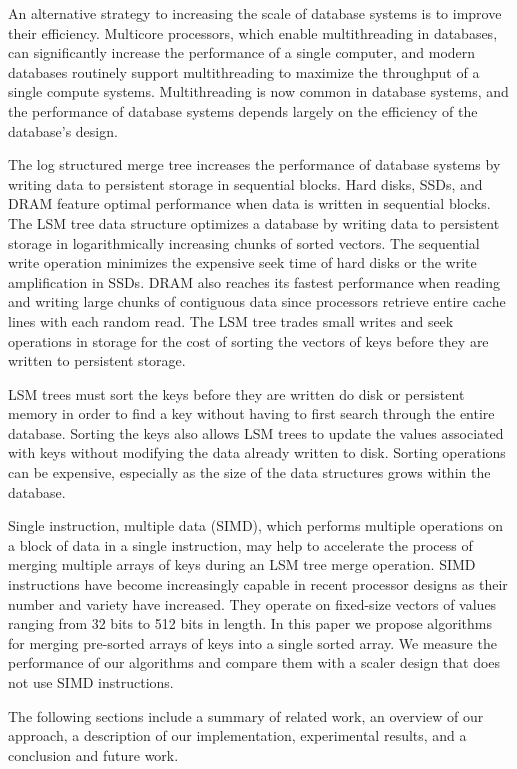 \documentclass[10pt,twocolumn]{article}
\begin{document}
An alternative strategy to increasing the scale of database systems is to improve their efficiency.  Multicore processors, which enable multithreading in databases, can significantly increase the performance of a single computer, and modern databases routinely support multithreading to maximize the throughput of a single compute systems.  Multithreading is now common in database systems, and the performance of database systems depends largely on the efficiency of the database's design.

The log structured merge tree increases the performance of database systems by writing data to persistent storage in sequential blocks.  Hard disks, SSDs, and DRAM feature optimal performance when data is written in sequential blocks.  The LSM tree data structure optimizes a database by writing data to persistent storage in logarithmically increasing chunks of sorted vectors.  The sequential write operation minimizes the expensive seek time of hard disks or the write amplification in SSDs.  DRAM also reaches its fastest performance when reading and writing large chunks of contiguous data since processors retrieve entire cache lines with each random read.  The LSM tree trades small writes and seek operations in storage for the cost of sorting the vectors of keys before they are written to persistent storage.

LSM trees must sort the keys before they are written do disk or persistent memory in order to find a key without having to first search through the entire database.  Sorting the keys also allows LSM trees to update the values associated with keys without modifying the data already written to disk.  Sorting operations can be expensive, especially as the size of the data structures grows within the database.

Single instruction, multiple data (SIMD), which performs multiple operations on a block of data in a single instruction, may help to accelerate the process of merging multiple arrays of keys during an LSM tree merge operation.  SIMD instructions have become increasingly capable in recent processor designs as their number and variety have increased.  They operate on fixed-size vectors of values ranging from 32 bits to 512 bits in length.  In this paper we propose algorithms for merging pre-sorted arrays of keys into a single sorted array.  We measure the performance of our algorithms and compare them with a scaler design that does not use SIMD instructions.

The following sections include a summary of related work, an overview of our approach, a description of our implementation, experimental results, and a conclusion and future work.
\end{document}
